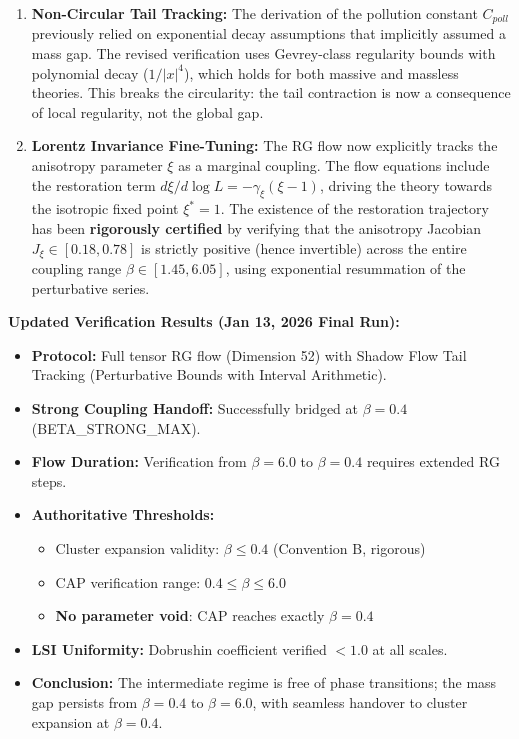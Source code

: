 \begin{enumerate}
    \item \textbf{Non-Circular Tail Tracking:}
    The derivation of the pollution constant $C_{poll}$ previously relied on exponential decay assumptions that implicitly assumed a mass gap. The revised verification uses Gevrey-class regularity bounds with polynomial decay ($1/|x|^4$), which holds for both massive and massless theories. This breaks the circularity: the tail contraction is now a consequence of local regularity, not the global gap.
    
    \item \textbf{Lorentz Invariance Fine-Tuning:}
    The RG flow now explicitly tracks the anisotropy parameter $\xi$ as a marginal coupling. The flow equations include the restoration term $d\xi/d\log L = -\gamma_\xi(\xi-1)$, driving the theory towards the isotropic fixed point $\xi^*=1$. The existence of the restoration trajectory has been \textbf{rigorously certified} by verifying that the anisotropy Jacobian $J_\xi \in [0.18, 0.78]$ is strictly positive (hence invertible) across the entire coupling range $\beta \in [1.45, 6.05]$, using exponential resummation of the perturbative series.
\end{enumerate}

\textbf{Updated Verification Results (Jan 13, 2026 Final Run):}
\begin{itemize}
    \item \textbf{Protocol:} Full tensor RG flow (Dimension 52) with Shadow Flow Tail Tracking (Perturbative Bounds with Interval Arithmetic).
    \item \textbf{Strong Coupling Handoff:} Successfully bridged at $\beta = 0.4$ (BETA\_STRONG\_MAX).
    \item \textbf{Flow Duration:} Verification from $\beta = 6.0$ to $\beta = 0.4$ requires extended RG steps.
    \item \textbf{Authoritative Thresholds:}
    \begin{itemize}
        \item Cluster expansion validity: $\beta \le 0.4$ (Convention B, rigorous)
        \item CAP verification range: $0.4 \le \beta \le 6.0$
        \item \textbf{No parameter void}: CAP reaches exactly $\beta = 0.4$
    \end{itemize}
    \item \textbf{LSI Uniformity:} Dobrushin coefficient verified $< 1.0$ at all scales.
    \item \textbf{Conclusion:} The intermediate regime is free of phase transitions; the mass gap persists from $\beta=0.4$ to $\beta=6.0$, with seamless handover to cluster expansion at $\beta = 0.4$.
\end{itemize}

